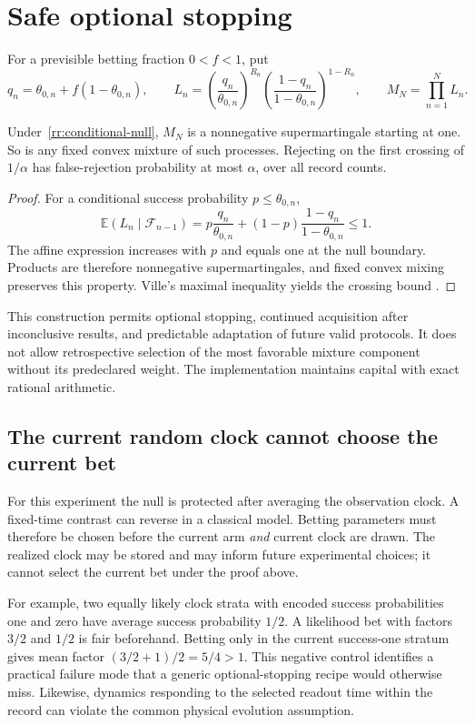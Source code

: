 \section{Safe optional stopping}
For a previsible betting fraction $0<f<1$, put
\[
 q_n=\theta_{0,n}+f(1-\theta_{0,n}),\qquad
 L_n=\left(\frac{q_n}{\theta_{0,n}}\right)^{R_n}
     \left(\frac{1-q_n}{1-\theta_{0,n}}\right)^{1-R_n},
 \qquad M_N=\prod_{n=1}^N L_n.
\]
\begin{proposition}
Under~\eqref{rr:conditional-null}, $M_N$ is a nonnegative supermartingale
starting at one. So is any fixed convex mixture of such processes.
Rejecting on the first crossing of $1/\alpha$ has false-rejection
probability at most $\alpha$, over all record counts.
\end{proposition}
\begin{proof}
For a conditional success probability $p\leq\theta_{0,n}$,
\[
 \mathbb E(L_n\mid\mathcal F_{n-1})
 =p\frac{q_n}{\theta_{0,n}}+
 (1-p)\frac{1-q_n}{1-\theta_{0,n}}\leq1.
\]
The affine expression increases with $p$ and equals one at the null
boundary. Products are therefore nonnegative supermartingales, and fixed
convex mixing preserves this property. Ville's maximal inequality yields
the crossing bound \cite{caVille1939,caWaudbySmithRamdas2024}.
\end{proof}

This construction permits optional stopping, continued acquisition after
inconclusive results, and predictable adaptation of future valid protocols.
It does not allow retrospective selection of the most favorable mixture
component without its predeclared weight. The implementation maintains
capital with exact rational arithmetic.

\subsection{The current random clock cannot choose the current bet}
For this experiment the null is protected after averaging the observation
clock. A fixed-time contrast can reverse in a classical model. Betting
parameters must therefore be chosen before the current arm \emph{and}
current clock are drawn. The realized clock may be stored and may inform
future experimental choices; it cannot select the current bet under the
proof above.

For example, two equally likely clock strata with encoded success
probabilities one and zero have average success probability $1/2$.
A likelihood bet with factors $3/2$ and $1/2$ is fair beforehand. Betting
only in the current success-one stratum gives mean factor
$(3/2+1)/2=5/4>1$. This negative control identifies a practical failure
mode that a generic optional-stopping recipe would otherwise miss.
Likewise, dynamics responding to the selected readout time within the
record can violate the common physical evolution assumption.

